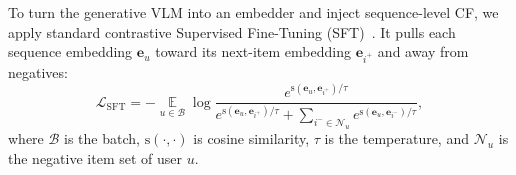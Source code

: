 \vspace{+0.1cm}
\label{sec:pre_sft}
To turn the generative VLM into an embedder and inject sequence-level CF, we apply standard contrastive Supervised Fine-Tuning (SFT)~\cite{infonce1}.
It pulls each sequence embedding $\mathbf{e}_u$ toward its next-item embedding $\mathbf{e}_{i^+}$ and away from negatives:
\begin{equation}
\mathcal{L}_{\text{SFT}} = - \mathop{\mathbb{E}}\limits_{u \in \mathcal{B}} \log\frac{e^{\text{s}(\mathbf{e}_u, \mathbf{e}_{i^+}) / \tau}}{e^{\text{s}(\mathbf{e}_u, \mathbf{e}_{i^+}) / \tau} + \sum_{i^- \in \mathcal{N}_u} e^{\text{s}(\mathbf{e}_u, \mathbf{e}_{i^-}) / \tau}},
\label{eq:sft_loss}
\end{equation}
where $\mathcal{B}$ is the batch, $\text{s}(\cdot,\cdot)$ is cosine similarity, $\tau$ is the temperature, and $\mathcal{N}_u$ is the negative item set of user $u$.